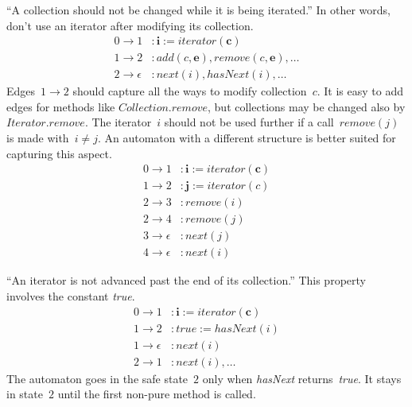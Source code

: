 \documentclass[a4paper]{article}
\theoremstyle{remark}
\begin{document}
``A collection should not be changed while it is being iterated.''
In other words, don't use an iterator after modifying its collection.
\begin{equation}\label{eq:iter1}
\begin{aligned}
0\to1&: \mathbf{i} := \mathit{iterator}(\mathbf{c})\\
1\to2&: \mathit{add}(c, \mathbf{e}), \mathit{remove}(c, \mathbf{e}), \ldots \\
2\to\epsilon&: \mathit{next}(i), \mathit{hasNext(i)}, \ldots
\end{aligned}
\end{equation}
Edges~$1\to2$ should capture all the ways to modify collection~$c$.
It is easy to add edges for methods like $\mathit{Collection}.\mathit{remove}$, but collections may be changed also by $\mathit{Iterator}.\mathit{remove}$.
The iterator~$i$ should not be used further if a call~$\mathit{remove}(j)$ is made with~$i\ne j$.
An automaton with a different structure is better suited for capturing this aspect.
\begin{equation}\label{eq:iter2}
\begin{aligned}
0\to1&: \mathbf{i} := \mathit{iterator}(\mathbf{c})\\
1\to2&: \mathbf{j} := \mathit{iterator}(c)\\
2\to3&: \mathit{remove}(i)\\
2\to4&: \mathit{remove}(j)\\
3\to\epsilon&: \mathit{next}(j)\\
4\to\epsilon&: \mathit{next}(i)
\end{aligned}
\end{equation}

``An iterator is not advanced past the end of its collection.''
This property involves the constant \textit{true}.
\begin{equation}\label{eq:iter3}
\begin{aligned}
0\to1&: \mathbf{i} := \mathit{iterator}(\mathbf{c}) \\
1\to2&: \mathit{true} := \mathit{hasNext}(i) \\
1\to\epsilon&: \mathit{next}(i) \\
2\to1&: \mathit{next}(i), \ldots
\end{aligned}
\end{equation}
The automaton goes in the safe state~$2$ only when \textit{hasNext} returns~\textit{true}.
It stays in state~$2$ until the first non-pure method is called.

\end{document}
